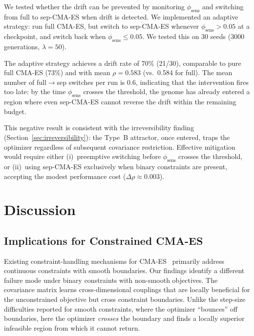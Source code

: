\documentclass[twoside]{article}
\begin{document}
We tested whether the drift can be prevented by monitoring
$\phi_{\text{sens}}$ and switching from full to sep-CMA-ES when drift is
detected. We implemented an adaptive strategy: run full CMA-ES, but switch
to sep-CMA-ES whenever $\phi_{\text{sens}} > 0.05$ at a checkpoint, and
switch back when $\phi_{\text{sens}} \leq 0.05$. We tested this on 30 seeds
(3000 generations, $\lambda = 50$).

The adaptive strategy achieves a drift rate of 70\% (21/30), comparable to
pure full CMA-ES (73\%) and with mean $\rho = 0.583$ (vs.\ 0.584 for full).
The mean number of full$\to$sep switches per run is 0.6, indicating that the
intervention fires too late: by the time $\phi_{\text{sens}}$ crosses the
threshold, the genome has already entered a region where even sep-CMA-ES
cannot reverse the drift within the remaining budget.

This negative result is consistent with the irreversibility finding
(Section~\ref{sec:irreversibility}): the Type~B attractor, once entered,
traps the optimizer regardless of subsequent covariance restriction. Effective
mitigation would require either (i)~preemptive switching before
$\phi_{\text{sens}}$ crosses the threshold, or (ii)~using sep-CMA-ES
exclusively when binary constraints are present, accepting the modest
performance cost ($\Delta\rho \approx 0.003$).

\section{Discussion}
\label{sec:discussion}

\subsection{Implications for Constrained CMA-ES}

Existing constraint-handling mechanisms for CMA-ES~\citep{arnold2012cmaes,
kramer2010cmaes,atamna2016augmented} primarily address continuous constraints
with smooth boundaries. Our findings identify a different failure
mode under binary constraints with non-smooth objectives. The covariance matrix
learns cross-dimensional couplings that are locally beneficial for the
unconstrained objective but cross constraint boundaries. Unlike the step-size difficulties reported for smooth constraints, where the
optimizer ``bounces'' off boundaries, here the optimizer \emph{crosses} the
boundary and finds a locally superior infeasible region from which it cannot
return.
\end{document}
